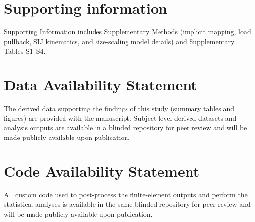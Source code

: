 \documentclass[11pt,a4paper]{article}
\begin{document}
\section*{Supporting information}
Supporting Information includes Supplementary Methods (implicit mapping, load pullback, SIJ kinematics, and size-scaling model details) and Supplementary Tables S1--S4.

\section*{Data Availability Statement}
The derived data supporting the findings of this study (summary tables and figures) are provided with the manuscript. Subject-level derived datasets and analysis outputs are available in a blinded repository for peer review and will be made publicly available upon publication.

\section*{Code Availability Statement}
All custom code used to post-process the finite-element outputs and perform the statistical analyses is available in the same blinded repository for peer review and will be made publicly available upon publication.



\end{document}
